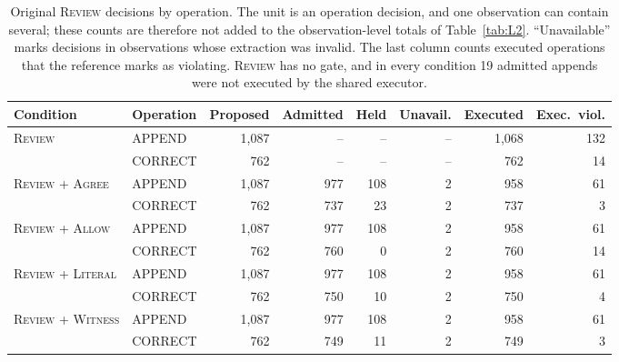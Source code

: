 \documentclass[acmsmall,review]{acmart}
\newcommand{\agree}{\textsc{Agree}}
\newcommand{\allow}{\textsc{Allow}}
\newcommand{\literal}{\textsc{Literal}}
\newcommand{\witness}{\textsc{Witness}}
\newcommand{\review}{\textsc{Review}}
\begin{document}
\begin{table}[H]
\centering
\caption{Original \review{} decisions by operation. The unit is an operation decision, and one observation can contain several; these counts are therefore not added to the observation-level totals of Table~\ref{tab:L2}. ``Unavailable'' marks decisions in observations whose extraction was invalid. The last column counts executed operations that the reference marks as violating. \review{} has no gate, and in every condition 19 admitted appends were not executed by the shared executor.}\label{tab:L3}
\small
\setlength{\tabcolsep}{3pt}
\begin{tabular}{@{}llrrrrrr@{}}
\toprule
\textbf{Condition} & \textbf{Operation} & \textbf{Proposed} & \textbf{Admitted} & \textbf{Held} & \textbf{Unavail.} & \textbf{Executed} & \textbf{Exec.\ viol.} \\
\midrule
\review{} & APPEND & 1,087 & -- & -- & -- & 1,068 & 132 \\
 & CORRECT & 762 & -- & -- & -- & 762 & 14 \\
\addlinespace[2pt]
\review{} + \agree{} & APPEND & 1,087 & 977 & 108 & 2 & 958 & 61 \\
 & CORRECT & 762 & 737 & 23 & 2 & 737 & 3 \\
\addlinespace[2pt]
\review{} + \allow{} & APPEND & 1,087 & 977 & 108 & 2 & 958 & 61 \\
 & CORRECT & 762 & 760 & 0 & 2 & 760 & 14 \\
\addlinespace[2pt]
\review{} + \literal{} & APPEND & 1,087 & 977 & 108 & 2 & 958 & 61 \\
 & CORRECT & 762 & 750 & 10 & 2 & 750 & 4 \\
\addlinespace[2pt]
\review{} + \witness{} & APPEND & 1,087 & 977 & 108 & 2 & 958 & 61 \\
 & CORRECT & 762 & 749 & 11 & 2 & 749 & 3 \\
\bottomrule
\end{tabular}
\end{table}
\end{document}

